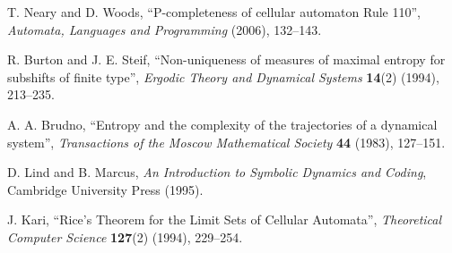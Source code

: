 \documentclass[12pt]{article}
\theoremstyle{plain}
\theoremstyle{definition}
\begin{document}
\begin{thebibliography}{99}
 T. Neary and D. Woods, ``P-completeness of cellular automaton Rule 110'', \emph{Automata, Languages and Programming} (2006), 132--143.

 R. Burton and J. E. Steif, ``Non-uniqueness of measures of maximal entropy for subshifts of finite type'', \emph{Ergodic Theory and Dynamical Systems} \textbf{14}(2) (1994), 213--235.

 A. A. Brudno, ``Entropy and the complexity of the trajectories of a dynamical system'', \emph{Transactions of the Moscow Mathematical Society} \textbf{44} (1983), 127--151.

 D. Lind and B. Marcus, \emph{An Introduction to Symbolic Dynamics and Coding}, Cambridge University Press (1995).

 J. Kari, ``Rice's Theorem for the Limit Sets of Cellular Automata'', \emph{Theoretical Computer Science} \textbf{127}(2) (1994), 229--254.

\end{thebibliography}
\end{document}
